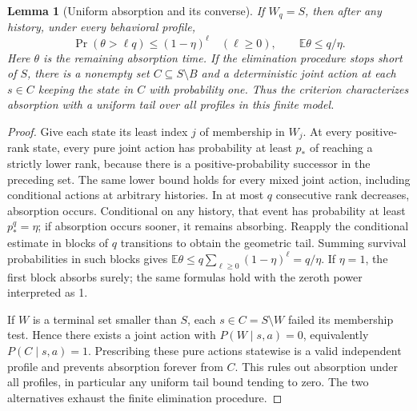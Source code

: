\documentclass[11pt,a4paper]{article}
\newcommand{\E}{\mathbb E}
\newtheorem{lemma}[theorem]{Lemma}
\theoremstyle{definition}
\theoremstyle{remark}
\begin{document}
\begin{lemma}[Uniform absorption and its converse]
If $W_q=S$, then after any history, under every behavioral profile,
\[
 \Pr(\theta>\ell q)\leq(1-\eta)^\ell\quad(\ell\geq0),
 \qquad \E\theta\leq q/\eta.
\]
Here $\theta$ is the remaining absorption time. If the elimination procedure stops short of $S$, there is a nonempty set $C\subseteq S\setminus B$ and a deterministic joint action at each $s\in C$ keeping the state in $C$ with probability one. Thus the criterion characterizes absorption with a uniform tail over all profiles in this finite model.
\end{lemma}
\begin{proof}
Give each state its least index $j$ of membership in $W_j$. At every positive-rank state, every pure joint action has probability at least $p_*$ of reaching a strictly lower rank, because there is a positive-probability successor in the preceding set. The same lower bound holds for every mixed joint action, including conditional actions at arbitrary histories. In at most $q$ consecutive rank decreases, absorption occurs. Conditional on any history, that event has probability at least $p_*^q=\eta$; if absorption occurs sooner, it remains absorbing. Reapply the conditional estimate in blocks of $q$ transitions to obtain the geometric tail. Summing survival probabilities in such blocks gives $\E\theta\leq q\sum_{\ell\geq0}(1-\eta)^\ell=q/\eta$. If $\eta=1$, the first block absorbs surely; the same formulas hold with the zeroth power interpreted as 1.

If $W$ is a terminal set smaller than $S$, each $s\in C=S\setminus W$ failed its membership test. Hence there exists a joint action with $P(W\mid s,a)=0$, equivalently $P(C\mid s,a)=1$. Prescribing these pure actions statewise is a valid independent profile and prevents absorption forever from $C$. This rules out absorption under all profiles, in particular any uniform tail bound tending to zero. The two alternatives exhaust the finite elimination procedure.
\end{proof}
\end{document}
